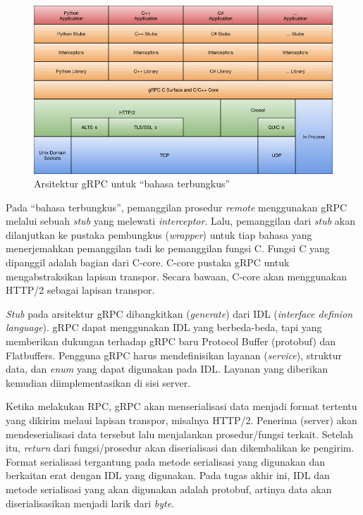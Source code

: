 \begin{figure}
    \centering
    \includegraphics[width=1.0\textwidth]{resources/chapter-2/grpc-arch.jpeg}
    \caption{Arsitektur gRPC untuk ``bahasa terbungkus''
        \parencite{mastrangelo_grpcStack}}
    \label{chapter-2-grpc-stack}
\end{figure}

Pada ``bahasa terbungkus'', pemanggilan prosedur \textit{remote} menggunakan
gRPC me\-la\-lu\-i sebuah \textit{stub} yang me\-le\-wa\-ti
\textit{interceptor}. Lalu, pemanggilan dari \textit{stub} akan dilanjutkan ke
pustaka pembungkus (\textit{wrapper}) untuk tiap bahasa yang
me\-ner\-je\-mah\-kan pemanggilan tadi ke pemanggilan fungsi C. Fungsi C yang
dipanggil adalah bagian dari C-core. C-core pustaka gRPC untuk mengabstraksikan
lapisan transpor. Secara bawaan, C-core akan menggunakan HTTP/2 sebagai
lapisan transpor.

\textit{Stub} pada arsitektur gRPC dibangkitkan (\textit{generate}) dari IDL
(\textit{interface definion language}). gRPC dapat menggunakan IDL yang
berbeda-beda, tapi yang memberikan dukungan terhadap gRPC baru Protocol Buffer
(protobuf) dan Flatbuffers. Pengguna gRPC harus mendefinisikan layanan
(\textit{service}), struktur data, dan \textit{enum} yang dapat digunakan pada
IDL. Layanan yang diberikan kemudian diimplementasikan di sisi server.

Ketika melakukan RPC, gRPC akan menserialisasi data menjadi format tertentu yang
dikirim melaui lapisan transpor, misalnya HTTP/2. Penerima (server) akan
mendeserialisasi data tersebut lalu menjalankan prosedur/fungsi terkait. Setelah
itu, \textit{return} dari fungsi/prosedur akan diserialisasi dan dikembalikan ke
pengirim. Format serialisasi tergantung pada metode serialisasi yang digunakan
dan berkaitan erat dengan IDL yang digunakan. Pada tugas akhir ini, IDL dan metode
serialisasi yang akan digunakan adalah protobuf, artinya data akan
diserialisasikan menjadi larik dari \textit{byte}.

